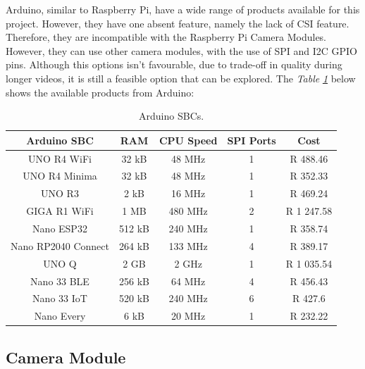 Arduino, similar to Raspberry Pi, have a wide range of products available for this project. However, they have one absent feature, namely the lack of CSI feature. Therefore, they are incompatible with the Raspberry Pi Camera Modules. However, they can use other camera modules, with the use of SPI and I2C GPIO pins. Although this options isn't favourable, due to trade-off in quality during longer videos, it is still a feasible option that can be explored. \citep{GH-AA} The \textit{Table} \textit{\ref{tab:Arduino SBCs}} below shows the available products from Arduino:

\begin{table}[H]
    \centering
    \caption{Arduino SBCs. \citep{A-P}}
    \begin{tabular}{|c|c|c|c|c|}
        \hline
            Arduino SBC & RAM & CPU Speed & SPI Ports & Cost \\
        \hline
            UNO R4 WiFi & 32 kB & 48 MHz & 1 & R 488.46 \\
        \hline 
            UNO R4 Minima & 32 kB & 48 MHz & 1 & R 352.33 \\
        \hline
            UNO R3 & 2 kB & 16 MHz & 1 & R 469.24\\
        \hline
            GIGA R1 WiFi & 1 MB & 480 MHz & 2 & R 1 247.58 \\
        \hline
            Nano ESP32 & 512 kB & 240 MHz & 1 & R 358.74 \\
        \hline
            Nano RP2040 Connect & 264 kB & 133 MHz & 4 & R 389.17 \\
        \hline
            UNO Q & 2 GB & 2 GHz & 1 & R 1 035.54 \\
        \hline
            Nano 33 BLE & 256 kB & 64 MHz & 4 & R 456.43 \\
        \hline
            Nano 33 IoT & 520 kB & 240 MHz & 6 & R 427.6 \\
        \hline
            Nano Every & 6 kB & 20 MHz & 1 & R 232.22 \\            
        \hline
    \end{tabular}
    \label{tab:Arduino SBCs}
\end{table}

\subsection{Camera Module}
\label{sec:Camera Module}



